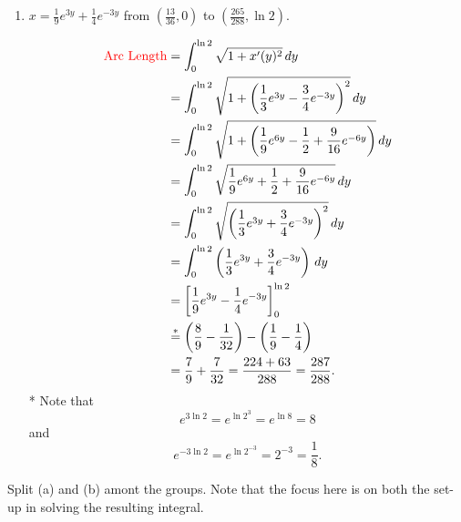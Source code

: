 \documentclass[noinstructornotes]{ximera}
\begin{document}
\begin{problem}
\begin{enumerate}
		\item  $x = \frac{1}{9} e^{3y} + \frac{1}{4} e^{-3y}$ from $\left( \frac{13}{36}, 0 \right)$ to $\left( \frac{265}{288}, \ln 2 \right)$.  
		\begin{freeResponse}
			\begin{align*}
			\text{{\color{red} Arc Length}} &= \int_0^{\ln 2} \sqrt{1+x'(y)^2} \,d y  \\
			&=\int_0^{\ln 2} \sqrt{1+ \left( \frac{1}{3}e^{3y} - \frac{3}{4}e^{-3y} \right)^2} \,d y  \\
			&=  \int_0^{\ln 2} \sqrt{1+ \left( \frac{1}{9}e^{6y} - \frac{1}{2} + \frac{9}{16}e^{-6y} \right)} \,d y  \\
			&= \int_0^{\ln 2} \sqrt{ \frac{1}{9}e^{6y} + \frac{1}{2} + \frac{9}{16}e^{-6y} } \,d y  \\
			&= \int_0^{\ln 2} \sqrt{ \left( \frac{1}{3}e^{3y} + \frac{3}{4}e^{-3y} \right)^2} \,d y  \\
			&= \int_0^{\ln 2} \left( \frac{1}{3}e^{3y} + \frac{3}{4}e^{-3y} \right) \,d y  \\
			&= \bigg[  \frac{1}{9}e^{3y} - \frac{1}{4}e^{-3y} \bigg]_0^{\ln 2}  \\
			&\overset{*}{=} \left( \frac{8}{9} - \frac{1}{32} \right) - \left( \frac{1}{9} - \frac{1}{4} \right)  \\
			&= \frac{7}{9} + \frac{7}{32} = \frac{224 + 63}{288} = \frac{287}{288}.
			\end{align*}
		* Note that
			\[
			e^{3 \ln 2} = e^{\ln 2^3} = e^{\ln 8} = 8
			\]
	and
			\[
			e^{-3 \ln 2} = e^{\ln 2^{-3}} = 2^{-3} = \frac{1}{8}.
			\]
		\end{freeResponse}
		
	\end{enumerate}

\end{problem}

\begin{instructorNotes}
Split (a) and (b) amont the groups.  
Note that the focus here is on both the set-up  in solving the resulting integral.
\end{instructorNotes}
\end{document}
